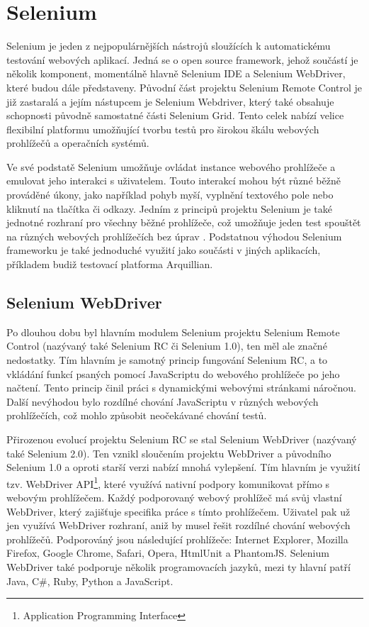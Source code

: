 \documentclass[
    color,   %
	table,   %
    twoside, %
]{fithesis3}
\begin{document}
  \section{Selenium}
 Selenium je jeden z nejpopulárnějších nástrojů sloužících k automatickému testování webových aplikací.   Jedná se o open source framework, jehož součástí je několik komponent, momentálně hlavně Selenium IDE a Selenium WebDriver, které budou dále představeny. Původní část projektu Selenium Remote Control je již zastaralá a jejím nástupcem je Selenium Webdriver, který také obsahuje schopnosti původně samostatné části Selenium Grid. Tento celek nabízí velice flexibilní platformu umožňující tvorbu testů pro širokou škálu webových prohlížečů a operačních systémů.
 
 Ve své podstatě Selenium umožňuje ovládat instance webového prohlížeče a emulovat jeho interakci s uživatelem. Touto interakcí mohou být různé běžně prováděné úkony, jako například pohyb myší, vyplnění textového pole nebo kliknutí na tlačítka či odkazy. Jedním z principů projektu Selenium je také jednotné rozhraní pro všechny běžné prohlížeče, což umožňuje jeden test spouštět na různých webových prohlížečích bez úprav \cite{SeleniumGithub}. Podstatnou výhodou Selenium frameworku je také jednoduché využití jako součásti v jiných aplikacích, příkladem budiž testovací platforma Arquillian.
 
  \subsection{Selenium WebDriver}
   Po dlouhou dobu byl hlavním modulem Selenium projektu Selenium Remote Control (nazývaný také Selenium RC či Selenium 1.0), ten měl ale značné nedostatky. Tím hlavním je samotný princip fungování Selenium RC, a to vkládání funkcí psaných pomocí JavaScriptu do webového prohlížeče po jeho načtení. Tento princip činil práci s dynamickými webovými stránkami náročnou. Další nevýhodou bylo rozdílné chování JavaScriptu v různých webových prohlížečích, což mohlo způsobit neočekávané chování testů.
  
Přirozenou evolucí projektu Selenium RC se stal Selenium WebDriver (nazývaný také Selenium 2.0). Ten vznikl sloučením projektu WebDriver a původního Selenium 1.0 a oproti starší verzi nabízí mnohá vylepšení. Tím hlavním je využití tzv. WebDriver API\footnote{Application Programming Interface}, které využívá nativní podpory komunikovat přímo s webovým prohlížečem. Každý podporovaný webový prohlížeč má svůj vlastní WebDriver, který zajišťuje specifika práce s tímto prohlížečem. Uživatel pak už jen využívá WebDriver rozhraní, aniž by musel řešit rozdílné chování webových prohlížečů. Podporováný jsou následující prohlížeče: Internet Explorer, Mozilla Firefox, Google Chrome, Safari, Opera, HtmlUnit a PhantomJS. Selenium WebDriver také podporuje několik programovacích jazyků, mezi ty hlavní patří Java, C\#, Ruby, Python a JavaScript.
\end{document}
